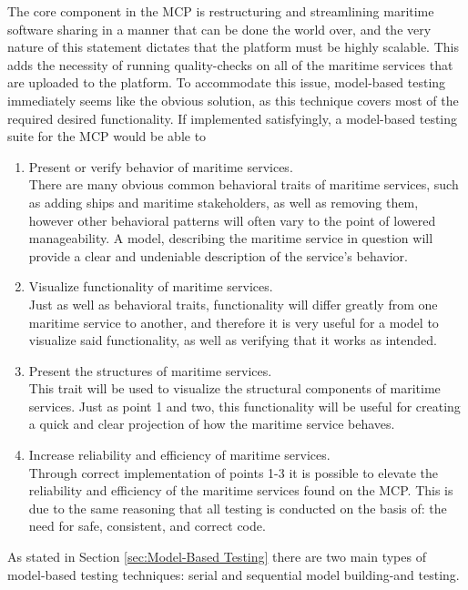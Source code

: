 The core component in the MCP is restructuring and streamlining maritime software sharing in a manner that can be done the world over, and the very nature of this statement dictates that the platform must be highly scalable. This adds the necessity of running quality-checks on all of the maritime services that are uploaded to the platform. To accommodate this issue, model-based testing immediately seems like the obvious solution, as this technique covers most of the required desired functionality. If implemented satisfyingly, a model-based testing suite for the MCP would be able to
\begin{enumerate}
	\item Present or verify behavior of maritime services.\\
	There are many obvious common behavioral traits of maritime services, such as adding ships and maritime stakeholders, as well as removing them, however other behavioral patterns will often vary to the point of lowered manageability. A model, describing the maritime service in question will provide a clear and undeniable description of the service's behavior.
	\item Visualize functionality of maritime services.\\
	Just as well as behavioral traits, functionality will differ greatly from one maritime service to another, and therefore it is very useful for a model to visualize said functionality, as well as verifying that it works as intended.
	\item Present the structures of maritime services.\\
	This trait will be used to visualize the structural components of maritime services. Just as point 1 and two, this functionality will be useful for creating a quick and clear projection of how the maritime service behaves.
	\item Increase reliability and efficiency of maritime services.\\
	Through correct implementation of points 1-3 it is possible to elevate the reliability and efficiency of the maritime services found on the MCP. This is due to the same reasoning that all testing is conducted on the basis of: the need for safe, consistent, and correct code.
\end{enumerate}

As stated in Section \ref{sec:Model-Based Testing} there are two main types of model-based testing techniques: serial and sequential model building-and testing. 


